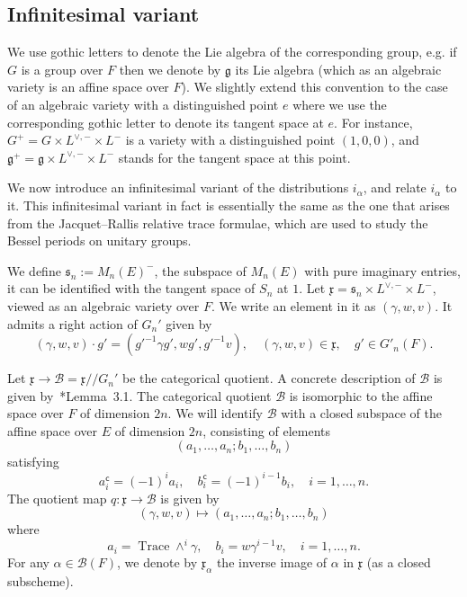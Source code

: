 \documentclass[letterpaper,11pt]{amsart}
\newcommand{\fg}{\mathfrak{g}}
\newcommand{\fs}{\mathfrak{s}}
\newcommand{\fx}{\mathfrak{x}}
\newcommand{\cB}{\mathcal{B}}
\newcommand{\<}{\negthickspace}
\DeclareMathOperator{\Trace}{Trace}
\theoremstyle{definition}
\theoremstyle{plain}
\theoremstyle{remark}
\numberwithin{equation}{section}
\begin{document}
\subsection{Infinitesimal variant}
\label{subsec:infinitesimal_GL}

We use gothic letters to denote the Lie algebra of the
corresponding group, e.g. if $G$ is a group over $F$ then we denote by $\fg$ its Lie algebra (which as an algebraic variety is an affine space over $F$).
We slightly extend this convention to the case of an algebraic
variety with a distinguished point $e$ where
we use the corresponding gothic
letter to denote its tangent space at $e$. For instance, $G^+ = G \times L^{\vee, -} \times L^{-}$ is a variety with a distinguished point $(1, 0, 0)$, and $\fg^+ = \fg \times L^{\vee, -} \times L^{-}$ stands for the tangent space at this point.

We now introduce an infinitesimal variant of the distributions $i_\alpha$,
and relate $i_{\alpha}$ to it. This infinitesimal variant in fact is essentially the same
as the one that arises from the Jacquet--Rallis relative trace formulae,
which are used to study the Bessel periods on unitary groups.

We define $\fs_n := M_n(E)^-$, the subspace of $M_n(E)$ with pure imaginary entries, it can be identified with the tangent space of $S_n$ at $1$. Let $\fx = \fs_n \times L^{\vee, -} \times L^-$, viewed as an
algebraic variety over $F$. We write an element in it as $(\gamma, w, v)$. It
admits a right action of $G_n'$ given by
    \begin{equation}    \label{eq:action_s_infinitesimal}
    (\gamma, w, v) \cdot g' = (g'^{-1}\gamma g', wg', g'^{-1}v), \quad
    (\gamma, w, v) \in \fx, \quad g' \in G'_n(F).
    \end{equation}

Let $\fx \to \cB = \fx //G_n'$ be the categorical quotient. A concrete description of $\cB$ is given by~\cite{Zhang1}*{Lemma~3.1}. The categorical quotient $\cB$ is isomorphic
to the affine space over $F$ of dimension $2n$. We will identify $\cB$ with a
closed subspace of the affine space over $E$ of dimension $2n$, consisting of
elements
    \[
    (a_1, \hdots, a_n; b_1, \hdots, b_n)
    \]
satisfying
    \[
    a_i^{\mathsf{c}} = (-1)^i a_i, \quad b_i^{\mathsf{c}} = (-1)^{i-1} b_i, \quad
    i = 1, \hdots, n.
    \]
The quotient map $q: \fx \to \cB$ is given by
    \[
    (\gamma, w, v) \mapsto (a_1, \hdots, a_n;
    b_1, \hdots, b_n)
    \]
where
    \[
    a_i = \Trace \wedge^i \gamma, \quad b_i = w \gamma^{i-1} v, \quad i = 1, \hdots, n.
    \]
For any $\alpha \in \cB(F)$, we denote by $\fx_{\alpha}$ the inverse image of
$\alpha$ in $\fx$ (as a closed subscheme).
\end{document}
